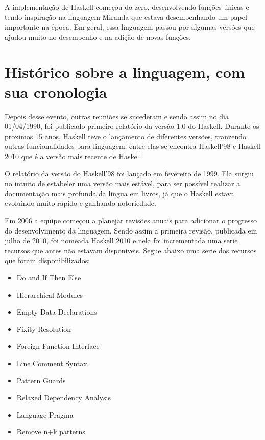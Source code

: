 \documentclass[
  article,			       %
  12pt,				         %
  oneside,			       %
  a4paper,			       %
  english,		       	 %
  brazil,			      	 %
  sumario=tradicional
]{abntex2}
\begin{document}
    A implementação de Haskell começou do zero, desenvolvendo funções únicas e tendo inspiração na linguagem Miranda que estava desempenhando um papel 
    importante na época. Em geral, essa linguagem passou por algumas versões que ajudou muito no desempenho e na adição de novas funções. 

    \newpage
    \chapter{Histórico sobre a linguagem, com sua cronologia}

    Depois desse evento, outras reuniões se sucederam e sendo assim no dia 01/04/1990, foi publicado primeiro relatório
    da versão 1.0 do Haskell. Durante os proximos 15 anos, Haskell teve o lançamento de diferentes versões, tranzendo outras
    funcionalidades para linguagem, entre elas se encontra Haskell'98 e Haskell 2010 que é a versão mais recente de Haskell.  

    O relatório da versão do Haskell'98 foi lançado em fevereiro de 1999. Ela surgiu no intuito de estabeler uma versão mais estável, 
    para ser possível realizar a documentação mais profunda da lingua em livros, já que o Haskell estava evoluindo muito rápido e ganhando 
    notoriedade.

    Em 2006 a equipe começou a planejar revisões anuais para adicionar o progresso do desenvolvimento da linguagem. Sendo assim a primeira revisão,
    publicada em julho de 2010, foi nomeada Haskell 2010 e nela foi incrementada uma serie recursos que antes não estavam disponiveis.
    Segue abaixo uma serie dos recursos que foram disponibilizados:
    
    \begin{itemize}
      \item Do and If Then Else 
      \item Hierarchical Modules
      \item Empty Data Declarations
      \item Fixity Resolution 
      \item Foreign Function Interface
      \item Line Comment Syntax
      \item Pattern Guards
      \item Relaxed Dependency Analysis
      \item Language Pragma
      \item Remove n+k patterns
    \end{itemize}
\end{document}
